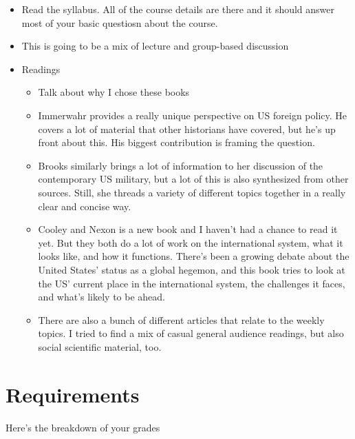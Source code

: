 \documentclass[
  12pt,
]{article}
\begin{document}
\begin{itemize}
\item
  Read the syllabus. All of the course details are there and it should
  answer most of your basic questiosn about the course.
\item
  This is going to be a mix of lecture and group-based discussion
\item
  Readings

  \begin{itemize}
  \item
    Talk about why I chose these books
  \item
    Immerwahr provides a really unique perspective on US foreign policy.
    He covers a lot of material that other historians have covered, but
    he's up front about this. His biggest contribution is framing the
    question.
  \item
    Brooks similarly brings a lot of information to her discussion of
    the contemporary US military, but a lot of this is also synthesized
    from other sources. Still, she threads a variety of different topics
    together in a really clear and concise way.
  \item
    Cooley and Nexon is a new book and I haven't had a chance to read it
    yet. But they both do a lot of work on the international system,
    what it looks like, and how it functions. There's been a growing
    debate about the United States' status as a global hegemon, and this
    book tries to look at the US' current place in the international
    system, the challenges it faces, and what's likely to be ahead.
  \item
    There are also a bunch of different articles that relate to the
    weekly topics. I tried to find a mix of casual general audience
    readings, but also social scientific material, too.
  \end{itemize}
\end{itemize}

\hypertarget{requirements}{%
\section{Requirements}\label{requirements}}

Here's the breakdown of your grades
\end{document}
